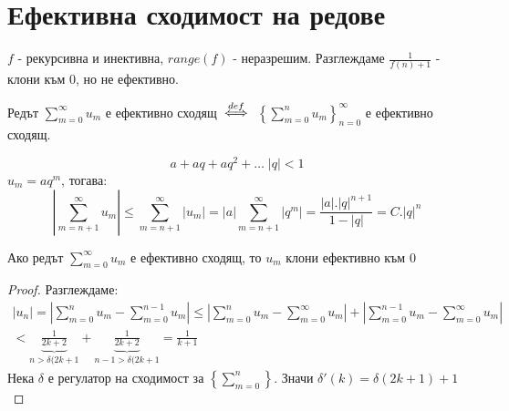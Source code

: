 \section{Ефективна сходимост на редове}
\begin{example}
    $f$ - рекурсивна и инективна, $range(f)$ - неразрешим. Разглеждаме $\frac{1}{f(n) + 1}$ - клони към 0, но не ефективно.
\end{example}

\begin{definition}
    Редът $\sum\limits_{m=0}^\infty u_m$ е ефективно сходящ ${\overset{def}{\iff}}$ $\left\{\sum\limits_{m=0}^n u_m\right\}_{n=0}^\infty$ е ефективно сходящ.
\end{definition}
\begin{example}
    \begin{equation*}
        a + aq + aq^2 + \dots \; |q| < 1
    \end{equation*}
    $u_m = aq^m$, тогава:
    \begin{equation*}
        \left\lvert\sum\limits_{m=n+1}^\infty u_m \right\rvert \leq \sum\limits_{m=n+1}^\infty | u_m | = |a| \sum\limits_{m=n+1}^\infty | q^m | = \frac{|a|.|q|^{n+1}}{1 - |q|} = C. |q|^n
    \end{equation*}
\end{example}
\begin{proposition}
    Ако редът $\sum\limits_{m=0}^\infty u_m$ е ефективно сходящ, то $u_m$ клони ефективно към 0
\end{proposition}
\begin{proof}
    Разглеждаме:
    \begin{equation*}
    \begin{split}
        |u_n| = \left| \sum\limits_{m=0}^n u_m - \sum\limits_{m=0}^{n-1} u_m \right| \leq \left| \sum\limits_{m=0}^n u_m - \sum\limits_{m=0}^\infty u_m \right| + \left|\sum\limits_{m=0}^{n-1} u_m - \sum\limits_{m=0}^\infty u_m \right| \\
        < \underbrace{\frac{1}{2k+2}}_{n > \delta(2k+1} + \underbrace{\frac{1}{2k+2}}_{n-1 > \delta(2k+1} = \frac{1}{k+1}
    \end{split}
    \end{equation*}
    Нека $\delta$ е регулатор на сходимост за $\left\{\sum\limits_{m=0}^n\right\}$. Значи $\delta'(k) = \delta(2k+1) + 1$
\end{proof}

